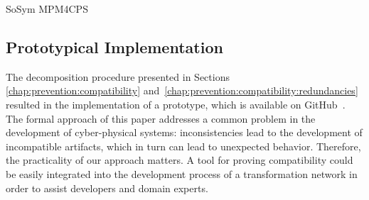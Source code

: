 \begin{copiedFrom}{SoSym MPM4CPS}


\subsection{Prototypical Implementation}
\label{sec:evaluation:prototype}

The decomposition procedure presented in Sections \ref{chap:prevention:compatibility} and~\ref{chap:prevention:compatibility:redundancies} resulted in the implementation of a prototype, which is available on GitHub~\cite{decompositionGithub}. The formal approach of this paper addresses a common problem in the development of cyber-physical systems: inconsistencies lead to the development of incompatible artifacts, which in turn can lead to unexpected behavior. Therefore, the practicality of our approach matters. A tool for proving compatibility could be easily integrated into the development process of a transformation network in order to assist developers and domain experts.


\end{copiedFrom}
